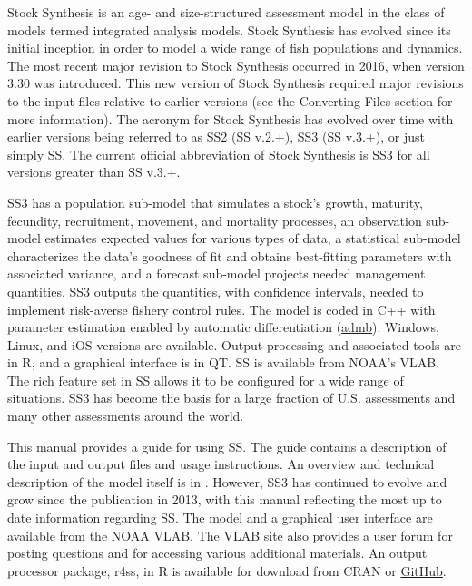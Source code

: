 Stock Synthesis is an age- and size-structured assessment model in the class of models termed integrated analysis models. Stock Synthesis has evolved since its initial inception in order to model a wide range of fish populations and dynamics.  The most recent major revision to Stock Synthesis occurred in 2016, when version 3.30 was introduced. This new version of Stock Synthesis required major revisions to the input files relative to earlier versions (see the \hypertarget{ConvIssues}{Converting Files} section for more information). The acronym for Stock Synthesis has evolved over time with earlier versions being referred to as SS2 (SS v.2.+), SS3 (SS v.3.+), or just simply SS.  The current official abbreviation of Stock Synthesis is SS3 for all versions greater than SS v.3.+. 


SS3 has a population sub-model that simulates a stock's growth, maturity, fecundity, recruitment, movement, and mortality processes, an observation sub-model estimates expected values for various types of data, a statistical sub-model characterizes the data’s goodness of fit and obtains best-fitting parameters with associated variance, and a forecast sub-model projects needed management quantities.  SS3 outputs the quantities, with confidence intervals, needed to implement risk-averse fishery control rules. The model is coded in C++ with parameter estimation enabled by automatic differentiation (\href{http://www.admb-project.org}{admb}).  Windows, Linux, and iOS versions are available.  Output processing and associated tools are in R, and a graphical interface is in QT.  SS is available from NOAA’s VLAB. The rich feature set in SS allows it to be configured for a wide range of situations.  SS3 has become the basis for a large fraction of U.S. assessments and many other assessments around the world.  

This manual provides a guide for using SS. The guide contains a description of the input and output files and usage instructions. An overview and technical description of the model itself is in \citet{methotstock2013}. However, SS3 has continued to evolve and grow since the publication in 2013, with this manual reflecting the most up to date information regarding SS.  The model and a graphical user interface are available from the NOAA \href{https://vlab.noaa.gov/group/stock-synthesis/home}{VLAB}. The VLAB site also provides a user forum for posting questions and for accessing various additional materials.  An output processor package, r4ss, in R is available for download from CRAN or \href{https://github.com/r4ss/r4ss}{GitHub}.

